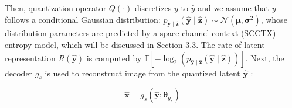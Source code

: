 Then, quantization operator $Q(\cdot)$ discretizes $y$ to $\hat y$ and we assume that $y$ follows a conditional Gaussian distribution:  
$p_{\hat{\boldsymbol{y}} \mid \hat{\boldsymbol{z}}}(\hat{\boldsymbol{y}} \mid \hat{\boldsymbol{z}}) \sim \mathcal{N}\left(\boldsymbol{\mu}, \boldsymbol{\sigma}^2\right)$, 
whose distribution parameters are predicted by a space-channel context (SCCTX) entropy model, which will be discussed in Section 3.3.
The rate of latent representation $R(\hat{\boldsymbol{y}})$ is computed by $\mathbb{E}\left[-\log _2\left(p_{\hat{\boldsymbol{y}} \mid \hat{\boldsymbol{z}}}(\hat{\boldsymbol{y}} \mid \hat{\boldsymbol{z}})\right)\right]$. Next, the decoder  $g_s$ is used to reconstruct image from the quantized latent $\hat{\boldsymbol{y}}$ :




%
%

\begin{equation}
\hat{\boldsymbol{x}}=g_s\left(\hat{\boldsymbol{y}} ; \boldsymbol{\theta}_{g_s}\right)
\end{equation}

